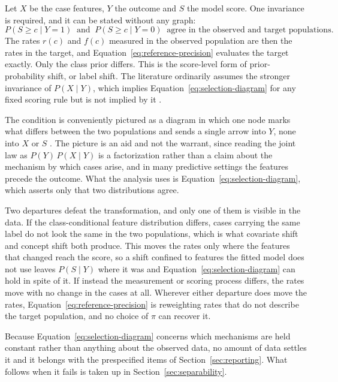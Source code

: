 \documentclass[11pt]{article}
\theoremstyle{remark}
\begin{document}
Let $X$ be the case features, $Y$ the outcome and $S$ the model score. One invariance is required, and it can be stated without any graph:
\begin{equation}
P(S\geq c\mid Y=1)
\ \text{ and }\
P(S\geq c\mid Y=0)
\ \text{ agree in the observed and target populations.}
\label{eq:selection-diagram}
\end{equation}
The rates $r(c)$ and $f(c)$ measured in the observed population are then the rates in the target, and Equation~\eqref{eq:reference-precision} evaluates the target exactly. Only the class prior differs. This is the score-level form of prior-probability shift, or label shift. The literature ordinarily assumes the stronger invariance of $P(X\mid Y)$, which implies Equation~\eqref{eq:selection-diagram} for any fixed scoring rule but is not implied by it \cite{saerens2002adjusting,storkey2009training,lipton2018detecting}.

The condition is conveniently pictured as a diagram in which one node marks what differs between the two populations and sends a single arrow into $Y$, none into $X$ or $S$ \cite{pearl2011transportability,bareinboim2013transportability}. The picture is an aid and not the warrant, since reading the joint law as $P(Y)\,P(X\mid Y)$ is a factorization rather than a claim about the mechanism by which cases arise, and in many predictive settings the features precede the outcome. What the analysis uses is Equation~\eqref{eq:selection-diagram}, which asserts only that two distributions agree.

Two departures defeat the transformation, and only one of them is visible in the data. If the class-conditional feature distribution differs, cases carrying the same label do not look the same in the two populations, which is what covariate shift and concept shift both produce. This moves the rates only where the features that changed reach the score, so a shift confined to features the fitted model does not use leaves $P(S\mid Y)$ where it was and Equation~\eqref{eq:selection-diagram} can hold in spite of it. If instead the measurement or scoring process differs, the rates move with no change in the cases at all. Wherever either departure does move the rates, Equation~\eqref{eq:reference-precision} is reweighting rates that do not describe the target population, and no choice of $\pi$ can recover it.

Because Equation~\eqref{eq:selection-diagram} concerns which mechanisms are held constant rather than anything about the observed data, no amount of data settles it and it belongs with the prespecified items of Section~\ref{sec:reporting}. What follows when it fails is taken up in Section~\ref{sec:separability}.
\end{document}
